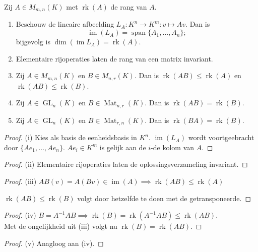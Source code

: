 \begin{lemma}[5.1.6]
    Zij $A \in M_{m,n}(K)$ met $\operatorname{rk}(A)$ de rang van $A$.
    \begin{enumerate}
        \item[(i)] Beschouw de lineaire afbeelding $L_A \colon K^n \to K^m \colon v \mapsto Av$. Dan is
        \[ \operatorname{im}(L_A) = \operatorname{span}\{A_1, \dots, A_n\}; \]
        bijgevolg is $\operatorname{dim}(\operatorname{im} L_A) = \operatorname{rk}(A)$.
        \item[(ii)] Elementaire rijoperaties laten de rang van een matrix invariant.
        \item[(iii)] Zij $A \in M_{m,n}(K)$ en $B \in M_{n,r}(K)$. Dan is $\operatorname{rk}(AB) \le \operatorname{rk}(A)$ en $\operatorname{rk}(AB) \le \operatorname{rk}(B)$.
        \item[(iv)] Zij $A \in \operatorname{GL}_n(K)$ en $B \in \operatorname{Mat}_{n,r}(K)$. Dan is $\operatorname{rk}(AB) = \operatorname{rk}(B)$.
        \item[(v)] Zij $A \in \operatorname{GL}_n(K)$ en $B \in \operatorname{Mat}_{r,n}(K)$. Dan is $\operatorname{rk}(BA) = \operatorname{rk}(B)$.
    \end{enumerate}
\end{lemma}
\begin{proof}(i)
    Kies als basis de eenheidsbasis in \(K^n\). \(\operatorname{im}(L_A)\) wordt voortgeebracht door \(\{Ae_1,\dots,Ae_n\}\).
    \(Ae_i \in K^m\) is gelijk aan de \(i\)-de kolom van \(A\).
\end{proof}
\begin{proof}(ii)
      Elementaire rijoperaties laten de oplossingsverzameling invariant.
\end{proof}
\begin{proof}(iii)
    \(AB(v) = A(Bv) \in \operatorname{im}(A) \implies \operatorname{rk}(AB) \leq \operatorname{rk}(A) \)

    \(\operatorname{rk}(AB) \leq \operatorname{rk}(B) \) volgt door hetzelfde te doen met de getransponeerde.
\end{proof}
\begin{proof}(iv)
      \(B = A^{-1}AB \implies \operatorname{rk}(B) = \operatorname{rk}(A^{-1}AB) \leq \operatorname{rk}(AB)\).\\
      Met de ongelijkheid uit (iii) volgt nu \(\operatorname{rk}(B) = \operatorname{rk}(AB)\).
\end{proof}
\begin{proof}(v)
      Anagloog aan (iv).
\end{proof}

